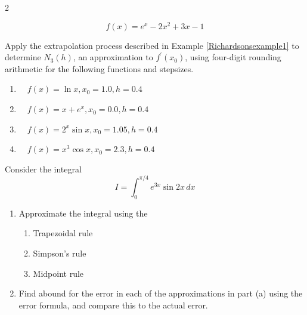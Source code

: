 \begin{posttest}
\begin{multicols}{2}
\begin{enumerate}[label=(\alph*)]
 \[f(x)=e^{x}-2 x^{2}+3 x-1\]
\end{enumerate}
\end{multicols}

\item Apply the extrapolation process described in Example \ref{Richardsonsexample1} to determine $N_{3}(h)$, an approximation to $f^{\prime}\left(x_{0}\right)$, using four-digit rounding arithmetic for the following functions and stepsizes.
\begin{enumerate}[label=(\alph*)]
\item $\quad f(x)=\ln x, x_{0}=1.0, h=0.4$\\
\item $\quad f(x)=x+e^{x}, x_{0}=0.0, h=0.4$\\
\item $\quad f(x)=2^{x} \sin x, x_{0}=1.05, h=0.4$\\
\item $\quad f(x)=x^{3} \cos x, x_{0}=2.3, h=0.4$
\end{enumerate}
\item Consider the integral 
\[I=\int_0^{\pi/4}e^{3x}\sin2x\,dx\]
\begin{enumerate}[label=(\alph*)]
\item Approximate the integral using the
\begin{enumerate}[label=\roman*.]
\item Trapezoidal rule
\item Simpson's rule
\item Midpoint rule
\end{enumerate}
\item Find abound for the error in each of the approximations in part (a) using the error formula, and compare this to the actual error.
\end{enumerate}


\end{posttest}
